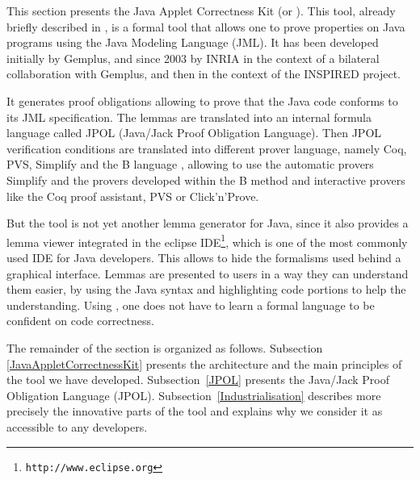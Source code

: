 This section presents the Java Applet Correctness Kit (or \JACK).
This tool, already briefly described in \cite{BR-gdc2002,BRL-JACK}, is
a formal tool that allows one to prove properties on Java programs
using the Java Modeling Language \cite{Leavens-Baker-Ruby03} (JML).
It has been developed initially by Gemplus, and since 2003 by INRIA
in the context of a bilateral collaboration with Gemplus, and then
in the context of the INSPIRED project.


It generates proof obligations allowing to prove that the Java code
conforms to its JML specification.  The lemmas are translated into an
internal formula language called JPOL (Java/Jack Proof Obligation
Language). Then JPOL verification conditions are translated into
different prover language, namely Coq, PVS, Simplify and the B
language \cite{bbook}, allowing to use the automatic provers Simplify
and the provers developed within the B method and interactive provers
like the Coq proof assistant, PVS or Click'n'Prove.

 But the tool is not yet another lemma generator for Java, since it
 also provides a lemma viewer integrated in the eclipse
 IDE\footnote{\texttt{http://www.eclipse.org}}, which is one of the
 most commonly used IDE for Java developers.  This allows to hide the
 formalisms used behind a graphical interface.  Lemmas are presented
 to users in a way they can understand them easier, by using the Java
 syntax and highlighting code portions to help the
 understanding. Using \JACK, one does not have to learn a formal
 language to be confident on code correctness.

 The remainder of the section is organized as follows.  Subsection
 \ref{JavaAppletCorrectnessKit} presents the architecture and the main
 principles of the tool we have developed.  Subsection~\ref{JPOL}
 presents the Java/Jack Proof Obligation Language (JPOL).
 Subsection~\ref{Industrialisation} describes more precisely the
 innovative parts of the tool and explains why we consider it as
 accessible to any developers.
